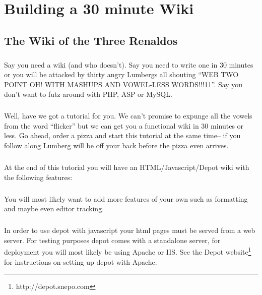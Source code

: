 \documentclass{report}
\begin{document}
\setlength{\headsep}{16pt}

\tableofcontents

\chapter{Building a 30 minute Wiki}
\section{The Wiki of the Three Renaldos}

\paragraph{}
Say you need a wiki (and who doesn't). Say you need to write one in 30
minutes or you will be attacked by thirty angry Lumbergs all shouting
``WEB TWO POINT OH! WITH MASHUPS AND VOWEL-LESS WORDS!!!11''. Say you
don't want to futz around with PHP, ASP or MySQL. 

\paragraph{}
Well, have we got a tutorial for you. We can't promise to expunge all
the vowels from the word ``flicker'' but we can get you a functional
wiki in 30 minutes or less. Go ahead, order a pizza and start this
tutorial at the same time-- if you follow along Lumberg will be off
your back before the pizza even arrives.

\paragraph{}
At the end of this tutorial you will have an HTML/Javascript/Depot
wiki with the following features: 


\paragraph{}
You will most likely want to add more features of your own such as
formatting and maybe even editor tracking.

\paragraph{}
In order to use depot with javascript your html pages must be served
from a web server. For testing purposes depot comes with a standalone
server, for deployment you will most likely be using Apache or
IIS. See the Depot website\footnote{http://depot.snepo.com} for instructions on
setting up depot with Apache.
\end{document}
